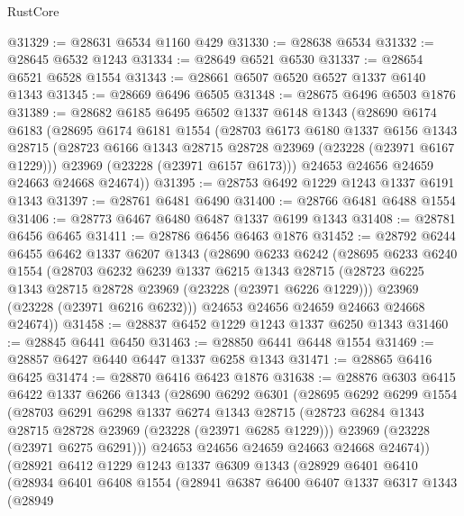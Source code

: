 \begin{lexlean}{RustCore}
\begin{coremodule}
@31329 := @28631 @6534 @1160 @429
@31330 := @28638 @6534
@31332 := @28645 @6532 @1243
@31334 := @28649 @6521 @6530
@31337 := @28654 @6521 @6528 @1554
@31343 := @28661 @6507 @6520 @6527 @1337 @6140 @1343
@31345 := @28669 @6496 @6505
@31348 := @28675 @6496 @6503 @1876
@31389 := @28682
    @6185
    @6495
    @6502
    @1337
    @6148
    @1343
    (@28690
      @6174
      @6183
      (@28695
        @6174
        @6181
        @1554
        (@28703
          @6173
          @6180
          @1337
          @6156
          @1343
          @28715
          (@28723 @6166 @1343 @28715 @28728 @23969 (@23228 (@23971 @6167 @1229)))
          @23969
          (@23228 (@23971 @6157 @6173)))
        @24653
        @24656
        @24659
        @24663
        @24668
        @24674))
@31395 := @28753 @6492 @1229 @1243 @1337 @6191 @1343
@31397 := @28761 @6481 @6490
@31400 := @28766 @6481 @6488 @1554
@31406 := @28773 @6467 @6480 @6487 @1337 @6199 @1343
@31408 := @28781 @6456 @6465
@31411 := @28786 @6456 @6463 @1876
@31452 := @28792
    @6244
    @6455
    @6462
    @1337
    @6207
    @1343
    (@28690
      @6233
      @6242
      (@28695
        @6233
        @6240
        @1554
        (@28703
          @6232
          @6239
          @1337
          @6215
          @1343
          @28715
          (@28723 @6225 @1343 @28715 @28728 @23969 (@23228 (@23971 @6226 @1229)))
          @23969
          (@23228 (@23971 @6216 @6232)))
        @24653
        @24656
        @24659
        @24663
        @24668
        @24674))
@31458 := @28837 @6452 @1229 @1243 @1337 @6250 @1343
@31460 := @28845 @6441 @6450
@31463 := @28850 @6441 @6448 @1554
@31469 := @28857 @6427 @6440 @6447 @1337 @6258 @1343
@31471 := @28865 @6416 @6425
@31474 := @28870 @6416 @6423 @1876
@31638 := @28876
    @6303
    @6415
    @6422
    @1337
    @6266
    @1343
    (@28690
      @6292
      @6301
      (@28695
        @6292
        @6299
        @1554
        (@28703
          @6291
          @6298
          @1337
          @6274
          @1343
          @28715
          (@28723 @6284 @1343 @28715 @28728 @23969 (@23228 (@23971 @6285 @1229)))
          @23969
          (@23228 (@23971 @6275 @6291)))
        @24653
        @24656
        @24659
        @24663
        @24668
        @24674))
    (@28921
      @6412
      @1229
      @1243
      @1337
      @6309
      @1343
      (@28929
        @6401
        @6410
        (@28934
          @6401
          @6408
          @1554
          (@28941
            @6387
            @6400
            @6407
            @1337
            @6317
            @1343
            (@28949

\end{coremodule}
\end{lexlean}
